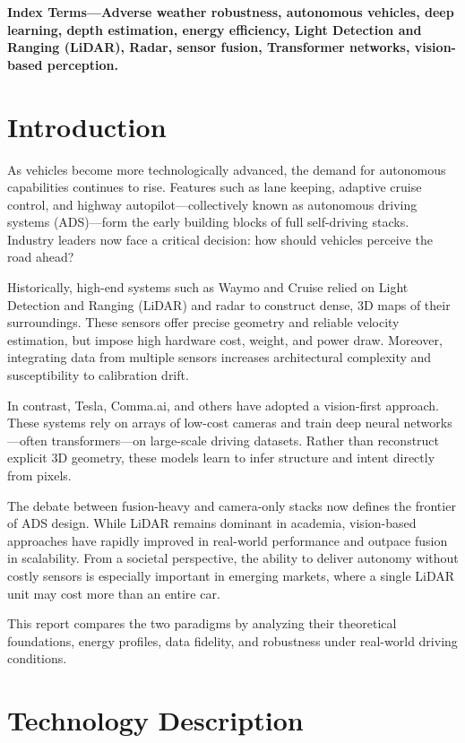 \documentclass[12pt]{article}
\begin{document}
\textbf{Index Terms—Adverse weather robustness, autonomous vehicles, deep
	learning, depth estimation, energy efficiency, Light Detection and Ranging
(LiDAR), Radar, sensor fusion, Transformer networks, vision-based perception.}
\newpage

\section{Introduction}

As vehicles become more technologically advanced, the demand for autonomous
capabilities continues to rise. Features such as lane keeping, adaptive cruise
control, and highway autopilot—collectively known as autonomous driving systems (ADS)—form the early building blocks of full self-driving stacks. Industry leaders now face a critical decision: how should vehicles perceive the road ahead?

Historically, high-end systems such as Waymo and Cruise relied on Light Detection and Ranging (LiDAR) and radar to construct dense, 3D maps of their surroundings. These sensors offer precise geometry and reliable velocity estimation, but impose high hardware cost, weight, and power draw. Moreover, integrating data from multiple sensors increases architectural complexity and susceptibility to calibration drift.

In contrast, Tesla, Comma.ai, and others have adopted a vision-first approach. These systems rely on arrays of low-cost cameras and train deep neural networks—often transformers—on large-scale driving datasets. Rather than reconstruct explicit 3D geometry, these models learn to infer structure and intent directly from pixels.

The debate between fusion-heavy and camera-only stacks now defines the frontier of ADS design. While LiDAR remains dominant in academia, vision-based approaches have rapidly improved in real-world performance and outpace fusion in scalability. From a societal perspective, the ability to deliver autonomy without costly sensors is especially important in emerging markets, where a single LiDAR unit may cost more than an entire car.

This report compares the two paradigms by analyzing their theoretical foundations, energy profiles, data fidelity, and robustness under real-world driving conditions.

\section{Technology Description}
\end{document}
